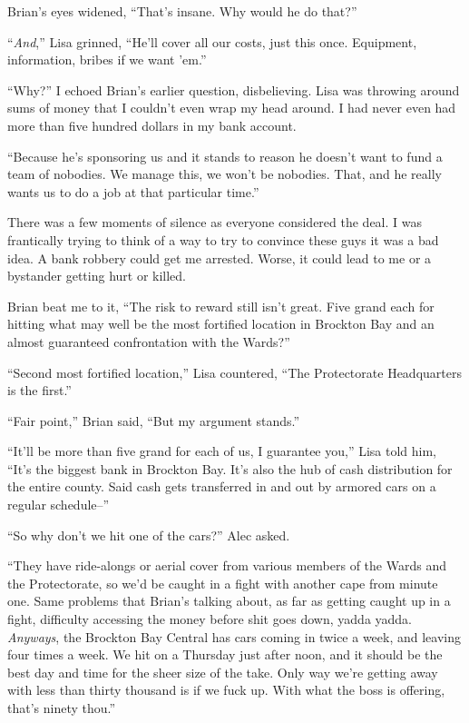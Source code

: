 Brian's eyes widened, ``That's insane.  Why would he do that?''



``\emph{And},'' Lisa grinned, ``He'll cover all our costs, just this once.  Equipment, information, bribes if we want 'em.''



``Why?'' I echoed Brian's earlier question, disbelieving.  Lisa was throwing around sums of money that I couldn't even wrap my head around.  I had never even had more than five hundred dollars in my bank account.



``Because he's sponsoring us and it stands to reason he doesn't want to fund a team of nobodies.  We manage this, we won't be nobodies.  That, and he really wants us to do a job at that particular time.''



There was a few moments of silence as everyone considered the deal.  I was frantically trying to think of a way to try to convince these guys it was a bad idea.  A bank robbery could get me arrested.  Worse, it could lead to me or a bystander getting hurt or killed.



Brian beat me to it, ``The risk to reward still isn't great.  Five grand each for hitting what may well be the most fortified location in Brockton Bay and an almost guaranteed confrontation with the Wards?''



``Second most fortified location,'' Lisa countered, ``The Protectorate Headquarters is the first.''



``Fair point,'' Brian said, ``But my argument stands.''



``It'll be more than five grand for each of us, I guarantee you,'' Lisa told him, ``It's the biggest bank in Brockton Bay.  It's also the hub of cash distribution for the entire county.  Said cash gets transferred in and out by armored cars on a regular schedule--''



``So why don't we hit one of the cars?'' Alec asked.



``They have ride-alongs or aerial cover from various members of the Wards and the Protectorate, so we'd be caught in a fight with another cape from minute one.  Same problems that Brian's talking about, as far as getting caught up in a fight, difficulty accessing the money before shit goes down, yadda yadda.  \emph{Anyways}, the Brockton Bay Central has cars coming in twice a week, and leaving four times a week.  We hit on a Thursday just after noon, and it should be the best day and time for the sheer size of the take.  Only way we're getting away with less than thirty thousand is if we fuck up.  With what the boss is offering, that's ninety thou.''



